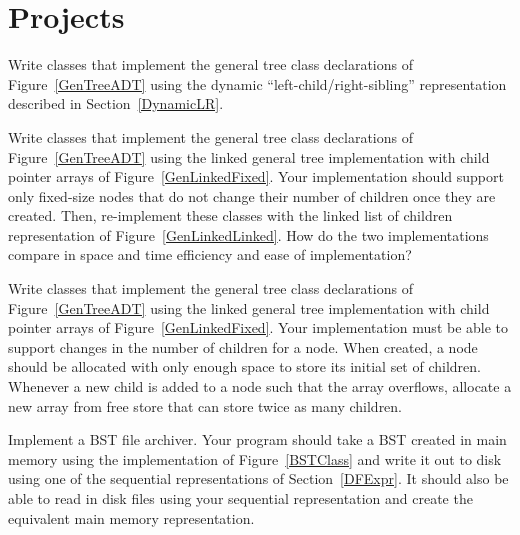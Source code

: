 \section{Projects}

\begin{projects}

\item
Write classes that implement the general tree class declarations of
Figure~\ref{GenTreeADT} using the dynamic ``left-child/right-sibling''
representation described in Section~\ref{DynamicLR}.

\item
Write classes that implement the general tree class declarations of
Figure~\ref{GenTreeADT} using the linked general tree implementation
with child pointer arrays of Figure~\ref{GenLinkedFixed}.
Your implementation should support only fixed-size nodes that do not
change their number of children once they are created.
Then, re-implement these classes with the linked list of children
representation of Figure~\ref{GenLinkedLinked}.
How do the two implementations compare in space and time efficiency
and ease of implementation?

\item
Write classes that implement the general tree class declarations of
Figure~\ref{GenTreeADT} using the linked general tree implementation
with child pointer arrays of Figure~\ref{GenLinkedFixed}.
Your implementation must be able to support changes in the number of
children for a node.
When created, a node should be allocated with only enough space to
store its initial set of children.
Whenever a new child is added to a node such that the array overflows,
allocate a new array from free store that can store twice as many
children.

\item
Implement a BST file archiver.
Your program should take a BST created in main memory using the
implementation of Figure~\ref{BSTClass} and write it out
to disk using one of the sequential representations of
Section~\ref{DFExpr}.
It should also be able to read in disk files using your sequential
representation and create the equivalent main memory representation.


\end{projects}
